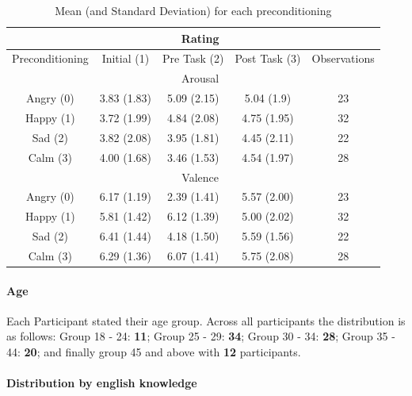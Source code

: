 	\begin{table}[h!]
	\begin{center}
				
		\begin{tabular}{|c|c|c|c|c|}
			\hline 
			& \multicolumn{3}{c|}{Rating} &  \\ 
			\hline 
			Preconditioning & Initial (1) & Pre Task (2) & Post Task (3) & Observations \\ 
			\hline 
			& \multicolumn{3}{|c|}{Arousal} &  \\ 
			\hline 
			Angry (0) & 3.83 (1.83) & 5.09 (2.15) & 5.04 (1.9) & 23 \\ 
			\hline 
			Happy (1) & 3.72 (1.99) & 4.84 (2.08) & 4.75 (1.95) & 32 \\ 
			\hline 
			Sad (2) & 3.82 (2.08) & 3.95 (1.81) & 4.45 (2.11) & 22 \\ 
			\hline 
			Calm (3) & 4.00 (1.68) & 3.46 (1.53) & 4.54 (1.97) & 28 \\ 
			\hline 
			& \multicolumn{3}{|c|}{Valence} &  \\ 
			\hline 
			Angry (0) & 6.17 (1.19) & 2.39 (1.41) & 5.57 (2.00) & 23 \\ 
			\hline 
			Happy (1) & 5.81 (1.42) & 6.12 (1.39) & 5.00 (2.02) & 32 \\ 
			\hline 
			Sad (2) & 6.41 (1.44) & 4.18 (1.50) & 5.59 (1.56) & 22 \\ 
			\hline 
			Calm (3) & 6.29 (1.36) & 6.07 (1.41) & 5.75 (2.08) & 28 \\ 
			\hline 
		\end{tabular}
	\end{center}
	\caption{Mean (and Standard Deviation) for each preconditioning}
	\label{tbl:distributionOfAffect}
	\end{table}

	\paragraph{Age}
	
	Each Participant stated their age group. Across all participants the distribution is as follows: Group 18 - 24: \textbf{11};
	Group 25 - 29: \textbf{34}; Group 30 - 34: \textbf{28}; Group 35 - 44: \textbf{20}; and finally group 45 and above with \textbf{12} participants.	

	\paragraph{Distribution by english knowledge} 
	
